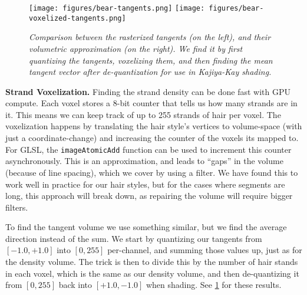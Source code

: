 \documentclass{egpubl}
\begin{document}
\begin{figure}[htb]
    \centering
    \texttt{[image: figures/bear-tangents.png]}
    \hfill
    \texttt{[image: figures/bear-voxelized-tangents.png]}
    \caption{\emph{Comparison between the rasterized tangents (on the left), and their volumetric approximation (on the right). We find it by first quantizing the tangents, voxelizing them, and then finding the mean tangent vector after de-quantization for use in Kajiya-Kay shading.}}
    \label{fig:tangents}
    \vspace{-2mm}
\end{figure}

\noindent \textbf{Strand Voxelization. } Finding the strand density can be done fast with GPU compute. Each voxel stores a 8-bit counter that tells us how many strands are in it. This means we can keep track of up to 255 strands of hair per voxel. The voxelization happens by translating the hair style's vertices to volume-space (with just a coordinate-change) and increasing the counter of the voxels its mapped to. For GLSL, the \texttt{imageAtomicAdd} function can be used to increment this counter asynchronously. This is an approximation, and leads to ``gaps'' in the volume (because of line spacing), which we cover by using a filter. We have found this to work well in practice for our hair styles, but for the cases where segments are long, this approach will break down, as repairing the volume will require bigger filters.


To find the tangent volume we use something similar, but we find the average direction instead of the sum. We start by quantizing our tangents from $[-1.0,+1.0]$ into $[0,255]$ per-channel, and summing those values up, just as for the density volume. The trick is then to divide this by the number of hair stands in each voxel, which is the same as our density volume, and then de-quantizing it from $[0,255]$ back into $[+1.0,-1.0]$ when shading. See \cref{fig:tangents} for these results.
\end{document}
